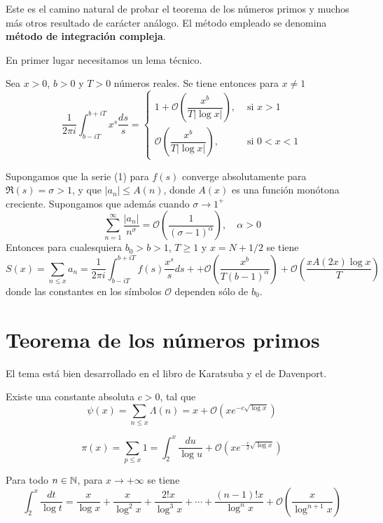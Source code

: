 \documentclass[TAN.tex]{subfiles}
\begin{document}
Este es el camino natural de probar el teorema de los números primos y muchos más otros resultado de carácter análogo. El método empleado se denomina \textbf{método de integración compleja}.

En primer lugar necesitamos un lema técnico.

\begin{lemma}
Sea $x > 0$, $b > 0$ y $T > 0$ números reales. Se tiene entonces para $x \neq 1$
\[ \frac{1}{2πi} \int_{b-iT}^{b+iT} x^s \frac{ds}{s} = \begin{cases}
	1+\mathcal{O}\left(\dfrac{x^b}{T|\log x|}\right), &\text{ si }x>1\\
	\mathcal{O}\left(\dfrac{x^b}{T|\log x|}\right), &\text{ si }0<x<1	
\end{cases} \]
\end{lemma}

\begin{teorema}
Supongamos que la serie (1) para $f(s)$ converge absolutamente para $\Re(s) = σ > 1$, y que $|a_n| ≤ A(n)$, donde $A(x)$ es una función monótona creciente. Supongamos que además cuando $σ \to 1^+$
\[ \sum_{n=1}^{∞} \frac{|a_n|}{n^σ} = \mathcal{O}\left(\frac{1}{(σ-1)^α}\right), \quad α > 0\]
Entonces para cualesquiera $b_0>b>1$, $T≥1$ y $x=N+1/2$ se tiene
\[ S(x) = \sum_{n≤x} a_n = \frac{1}{2πi} \int_{b-iT}^{b+iT} f(s) \frac{x^s}{s} ds ++ \mathcal{O}\left(\frac{x^b}{T(b-1)^α}\right) + \mathcal{O}\left(\frac{xA(2x)\log x}{T}\right)\]
donde las constantes en los símbolos $\mathcal{O}$ dependen sólo de $b_0$.
\end{teorema}

\section{Teorema de los números primos}
El tema está bien desarrollado en el libro de Karatsuba y el de Davenport.

\begin{teorema}
Existe una constante absoluta $c > 0$, tal que
\[ ψ(x) = \sum_{n≤x} Λ(n) = x + \mathcal{O}\left(xe^{-c\sqrt{\log x}}\right) \]
\end{teorema}

\begin{teorema}
\[ π(x) = \sum_{p≤x} 1 = \int_2^x \frac{du}{\log u} + \mathcal{O}\left(xe^{-\frac{c}{2} \sqrt{\log x}}\right) \]
\end{teorema}

\begin{prop}
Para todo $n \in \mathbb{N}$, para $x \to +∞$ se tiene
\[ \int_2^x \frac{dt}{\log t} = \frac{x}{\log x} + \frac{x}{\log^2 x} + \frac{2!x}{\log^3 x} + \cdots + \frac{(n-1)!x}{\log^n x} + \mathcal{O}\left(\frac{x}{\log^{n+1}x}\right) \]
\end{prop}
\end{document}
